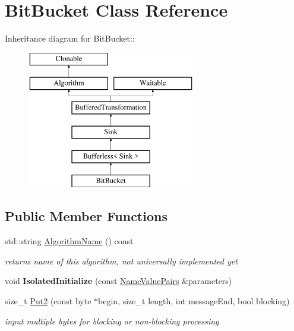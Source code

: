 \hypertarget{class_bit_bucket}{
\section{BitBucket Class Reference}
\label{class_bit_bucket}
}
Inheritance diagram for BitBucket::\begin{figure}[H]
\begin{center}
\leavevmode
\includegraphics[height=6cm]{class_bit_bucket}
\end{center}
\end{figure}
\subsection*{Public Member Functions}
\begin{DoxyCompactItemize}
\item 
\hypertarget{class_bit_bucket_aabe913bbc5c44567163211418bc43333}{
std::string \hyperlink{class_bit_bucket_aabe913bbc5c44567163211418bc43333}{AlgorithmName} () const }
\label{class_bit_bucket_aabe913bbc5c44567163211418bc43333}

\begin{DoxyCompactList}\small\item\em returns name of this algorithm, not universally implemented yet \item\end{DoxyCompactList}\item 
\hypertarget{class_bit_bucket_ad106f70b2c493d57408bb53460213f3a}{
void {\bfseries IsolatedInitialize} (const \hyperlink{class_name_value_pairs}{NameValuePairs} \&parameters)}
\label{class_bit_bucket_ad106f70b2c493d57408bb53460213f3a}

\item 
size\_\-t \hyperlink{class_bit_bucket_a943abc22eb4b838010fd58e50fab425a}{Put2} (const byte $\ast$begin, size\_\-t length, int messageEnd, bool blocking)
\begin{DoxyCompactList}\small\item\em input multiple bytes for blocking or non-\/blocking processing \item\end{DoxyCompactList}\end{DoxyCompactItemize}


